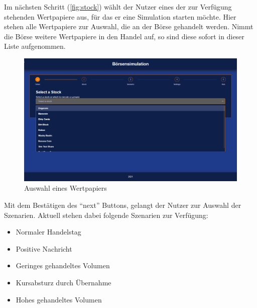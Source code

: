 Im nächsten Schritt (\autoref{fig:stock}) wählt der Nutzer eines der zur Verfügung stehenden Wertpapiere aus, für das er eine Simulation starten möchte. Hier stehen alle Wertpapiere zur Auswahl, die an der Börse gehandelt werden. Nimmt die Börse weitere Wertpapiere in den Handel auf, so sind diese sofort in dieser Liste aufgenommen.
\begin{figure}[ht]
	\includegraphics[width=\textwidth]{img/Stock.png}
	\centering
	\caption{Auswahl eines Wertpapiers}
	\label{fig:stock}
\end{figure}

Mit dem Bestätigen des \enquote{next} Buttons, gelangt der Nutzer zur Auswahl der Szenarien. Aktuell stehen dabei folgende Szenarien zur Verfügung:

\begin{itemize}
	\item Normaler Handelstag
	\item Positive Nachricht
	\item Geringes gehandeltes Volumen
	\item Kursabsturz durch Übernahme
	\item Hohes gehandeltes Volumen
\end{itemize}

